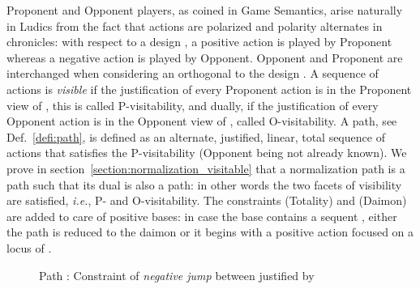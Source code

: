 \documentclass{LMCS}
\def\ie{{\em i.e.}}
\begin{document}
\noindent Proponent and Opponent players, as coined in Game Semantics, arise naturally in Ludics from the fact that actions are polarized and polarity alternates in chronicles: with respect to a design , a positive action is played by Proponent whereas a negative action is played by Opponent. Opponent and Proponent are interchanged when considering an orthogonal to the design . 
A sequence of actions is {\em visible} if the justification of every Proponent action  is in the Proponent view of , this is called P-visitability, and dually, if the justification of every Opponent action  is in the Opponent view of  , called O-visitability. 
 A path, see Def.~\ref{defi:path}, is defined as an alternate, justified, linear, total sequence of actions that satisfies the P-visitability (Opponent being not already known).
We prove in section~\ref{section:normalization_visitable} that a normalization path is a path such that its dual is also a path: in other words the two facets of visibility are satisfied, \ie, P- and O-visitability.
The constraints (Totality) and (Daimon) are added to care of positive bases: in case the base contains a sequent , either the path is reduced to the daimon or it begins with a positive action focused on a locus of .






\begin{figure}

\begin{center}
\end{center}
\caption{Path : Constraint of {\em negative jump} between  justified by }
\label{fig:NegJump}
\end{figure}
 
\end{document}
